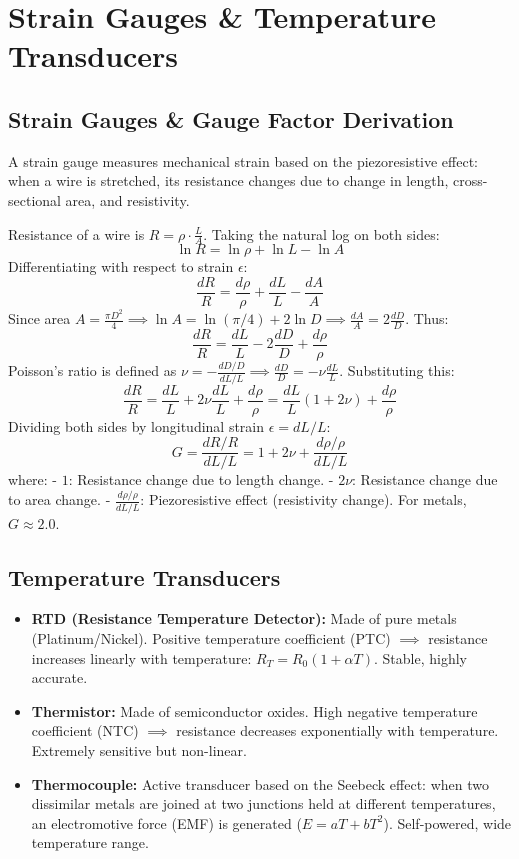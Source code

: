 \documentclass[12pt,a4paper]{article}
\begin{document}
\section{Strain Gauges \& Temperature Transducers}

\subsection{Strain Gauges \& Gauge Factor Derivation}
A strain gauge measures mechanical strain based on the piezoresistive effect: when a wire is stretched, its resistance changes due to change in length, cross-sectional area, and resistivity.

\begin{tcolorbox}[formulabox, title={\textbf{Gauge Factor (G) Derivation}}]
Resistance of a wire is $R = \rho \cdot \frac{L}{A}$. Taking the natural log on both sides:
$$\ln R = \ln \rho + \ln L - \ln A$$
Differentiating with respect to strain $\epsilon$:
$$\frac{dR}{R} = \frac{d\rho}{\rho} + \frac{dL}{L} - \frac{dA}{A}$$
Since area $A = \frac{\pi D^2}{4} \implies \ln A = \ln(\pi/4) + 2\ln D \implies \frac{dA}{A} = 2\frac{dD}{D}$. Thus:
$$\frac{dR}{R} = \frac{dL}{L} - 2\frac{dD}{D} + \frac{d\rho}{\rho}$$
Poisson's ratio is defined as $\nu = -\frac{dD/D}{dL/L} \implies \frac{dD}{D} = -\nu \frac{dL}{L}$. Substituting this:
$$\frac{dR}{R} = \frac{dL}{L} + 2\nu\frac{dL}{L} + \frac{d\rho}{\rho} = \frac{dL}{L}(1 + 2\nu) + \frac{d\rho}{\rho}$$
Dividing both sides by longitudinal strain $\epsilon = dL/L$:
$$G = \frac{dR/R}{dL/L} = 1 + 2\nu + \frac{d\rho/\rho}{dL/L}$$
where:
- $1$: Resistance change due to length change.
- $2\nu$: Resistance change due to area change.
- $\frac{d\rho/\rho}{dL/L}$: Piezoresistive effect (resistivity change). For metals, $G \approx 2.0$.
\end{tcolorbox}

\subsection{Temperature Transducers}
\begin{itemize}[leftmargin=*, itemsep=3.5pt]
  \item \textbf{RTD (Resistance Temperature Detector):} Made of pure metals (Platinum/Nickel). Positive temperature coefficient (PTC) $\implies$ resistance increases linearly with temperature: $R_T = R_0(1 + \alpha T)$. Stable, highly accurate.
  \item \textbf{Thermistor:} Made of semiconductor oxides. High negative temperature coefficient (NTC) $\implies$ resistance decreases exponentially with temperature. Extremely sensitive but non-linear.
  \item \textbf{Thermocouple:} Active transducer based on the Seebeck effect: when two dissimilar metals are joined at two junctions held at different temperatures, an electromotive force (EMF) is generated ($E = aT + bT^2$). Self-powered, wide temperature range.
\end{itemize}
\end{document}
